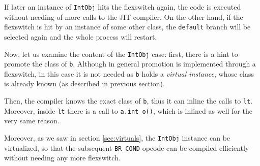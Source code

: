 If later an instance of \lstinline{IntObj} hits the flexswitch again, the
code is executed without needing of more calls to the JIT compiler.  On the
other hand, if the flexswitch is hit by an instance of some other class, the
\lstinline{default} branch will be selected again and the whole process will
restart.

Now, let us examine the content of the \lstinline{IntObj} case: first, there
is a hint to promote the class of \lstinline{b}.  Although in general
promotion is implemented through a flexswitch, in this case it is not needed
as \lstinline{b} holds a \emph{virtual instance}, whose class is already
known (as described in previous section).

Then, the compiler knows the exact class of \lstinline{b}, thus it can inline
the calls to \lstinline{lt}.  Moreover, inside \lstinline{lt} there is a
call to \lstinline{a.int_o()}, which is inlined as well for the very same
reason.

Moreover, as we saw in section \ref{sec:virtuals}, the \lstinline{IntObj}
instance can be virtualized, so that the subsequent \lstinline{BR_COND} opcode
can be compiled efficiently without needing any more flexswitch.
